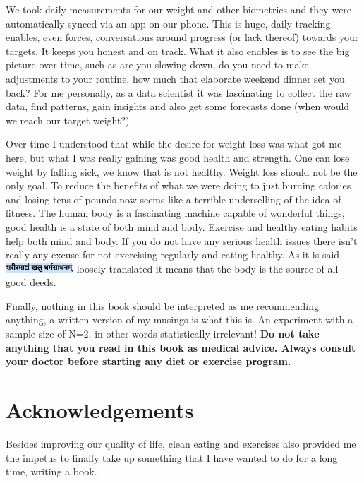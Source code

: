 \documentclass[
  oneside]{book}
\begin{document}
We took daily measurements for our weight and other biometrics and they were automatically synced via an app on our phone. This is huge, daily tracking enables, even forces, conversations around progress (or lack thereof) towards your targets. It keeps you honest and on track. What it also enables is to see the big picture over time, such as are you slowing down, do you need to make adjustments to your routine, how much that elaborate weekend dinner set you back? For me personally, as a data scientist it was fascinating to collect the raw data, find patterns, gain insights and also get some forecasts done (when would we reach our target weight?).

Over time I understood that while the desire for weight loss was what got me here, but what I was really gaining was good health and strength. One can lose weight by falling sick, we know that is not healthy. Weight loss should not be the only goal. To reduce the benefits of what we were doing to just burning calories and losing tens of pounds now seems like a terrible underselling of the idea of fitness. The human body is a fascinating machine capable of wonderful things, good health is a state of both mind and body. Exercise and healthy eating habits help both mind and body. If you do not have any serious health issues there isn't really any excuse for not exercising regularly and eating healthy. As it is said \includegraphics{pictures/sanskrit1.png} loosely translated it means that the body is the source of all good deeds.

Finally, nothing in this book should be interpreted as me recommending anything, a written version of my musings is what this is. An experiment with a sample size of N=2, in other words statistically irrelevant! \textbf{Do not take anything that you read in this book as medical advice. Always consult your doctor before starting any diet or exercise program.}

\hypertarget{acknowledgements}{%
\section{Acknowledgements}\label{acknowledgements}}

Besides improving our quality of life, clean eating and exercises also provided me the impetus to finally take up something that I have wanted to do for a long time, writing a book.
\end{document}
